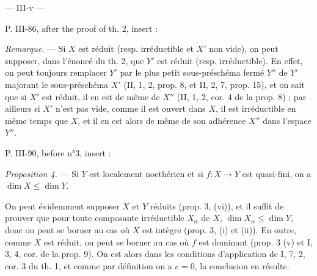 \newpage


\begin{center}
--- III-v ---
\end{center}

P. III-86, after the proof of th. 2, insert :

\emph{Remarque.} — Si $X$ est réduit (resp. irréductible et $X'$ non vide), on peut supposer, dans l'énoncé du th. 2, que $Y'$ est réduit (resp. irréductible). En effet, on peut toujours remplacer $Y'$ par le plus petit sous-préschéma fermé $Y''$ de $Y'$ majorant le sous-préschéma $X'$ (II, 1, 2, prop. 8, et II, 2, 7, prop. 15), et on sait que si $X'$ est réduit, il en est de même de $X''$ (II, 1, 2, cor. 4 de la prop. 8) ; par ailleurs si $X'$ n'est pas vide, comme il est ouvert dans $X$, il est irréductible en même temps que $X$, et il en est alors de même de son adhérence $X''$ dans l'espace $Y''$.

P. III-90, before n°3, insert :

\emph{Proposition 4.} — Si $Y$ est localement noethérien et si $f : X \to Y$ est quasi-fini, on a $\dim X \le \dim Y$.

On peut évidemment supposer $X$ et $Y$ réduits (prop. 3, (vi)), et il suffit de prouver que pour toute composante irréductible $X_\alpha$ de $X$, $\dim X_\alpha \le \dim Y$, donc on peut se borner au cas où $X$ est intègre (prop. 3, (i) et (ii)). En outre, comme $X$ est réduit, on peut se borner au cas où $f$ est dominant (prop. 3 (v) et I, 3, 4, cor. de la prop. 9). On est alors dans les conditions d'application de I, 7, 2, cor. 3 du th. 1, et comme par définition on a $e=0$, la conclusion en résulte.
